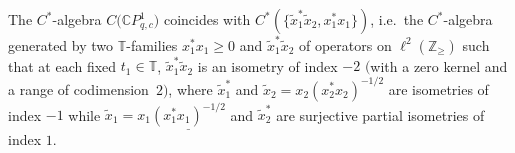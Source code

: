 \documentclass[pdftex]{sigma}
\begin{document}
\begin{theorem}\label{generators} The $C^*$-algebra $C\big(\mathbb{C}P_{q,c}^{1}\big)$ coincides with $C^{\ast} (
 \{ \tilde{x}_{1}^{\ast}\tilde{x}_{2},x_{1}^{\ast}x_{1} \} )
$, i.e.\ the $C^*$-algebra generated by two $\mathbb{T}$-families $x_{1}^{\ast}x_{1}\geq0$ and
$\tilde{x}_{1}^{\ast}\tilde{x}_{2}$ of operators on $\ell^{2} (
\mathbb{Z}_{\geq} ) $ such that at each fixed $t_{1}\mathbb{\in
}\mathbb{T}$, $\tilde{x}_{1}^{\ast}\tilde{x}_{2}$ is an isometry of index $-2$
$($with a zero kernel and a range of codimension~$2)$, where $\tilde{x}%
_{1}^{\ast}$ and $\tilde{x}_{2}=x_{2} ( x_{2}^{\ast}x_{2} )
^{-1/2}$ are isometries of index $-1$ while $\tilde{x}_{1}=x_{1}%
\underline{ ( x_{1}^{\ast}x_{1} ) ^{-1/2}}$ and $\tilde{x}%
_{2}^{\ast}$ are surjective partial isometries of index $1$.
\end{theorem}
\end{document}

